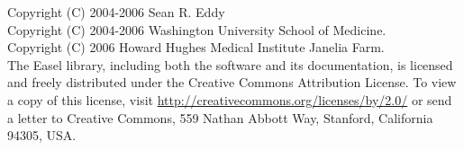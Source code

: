 \vspace*{\fill}

\noindent 
Copyright (C) 2004-2006 Sean R. Eddy\\
Copyright (C) 2004-2006 Washington University School of Medicine.\\
Copyright (C) 2006 Howard Hughes Medical Institute Janelia Farm.\\


\vspace{1.5em}
\noindent 
The Easel library, including both the software and its documentation,
is licensed and freely distributed under the Creative Commons
Attribution License.  To view a copy of this license, visit
\url{http://creativecommons.org/licenses/by/2.0/} or send a letter to
Creative Commons, 559 Nathan Abbott Way, Stanford, California 94305,
USA.


